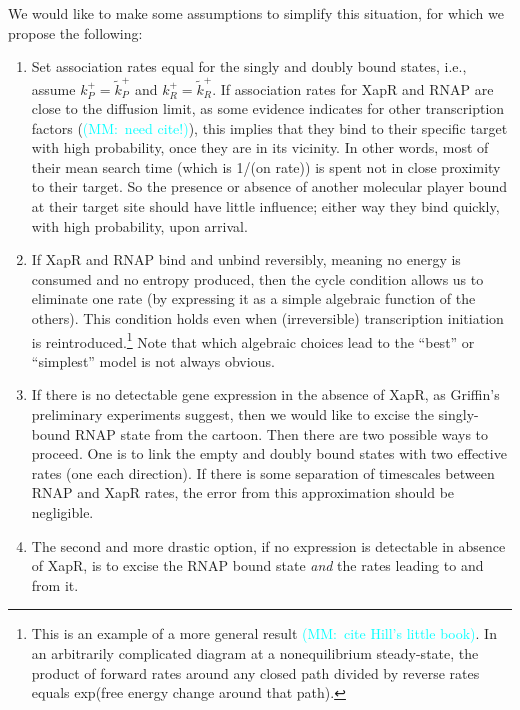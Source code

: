 \documentclass[12pt]{article}%
\newcommand{\rate}[3]{{#1}_{#2}^{#3}}
\newcommand{\mmnote}[1]{\textcolor{cyan}{(MM:~#1)}}
\begin{document}
We would like to make some assumptions to simplify this situation,
for which we propose the following:
\begin{enumerate}
    \item Set association rates equal for the singly and doubly bound states,
        i.e., assume $\rate{k}{P}{+} = \rate{\tilde{k}}{P}{+}$ and
        $\rate{k}{R}{+} = \rate{\tilde{k}}{R}{+}$.
        If association rates for XapR and RNAP are close to the diffusion limit,
        as some evidence indicates for other transcription factors (\mmnote{need cite!}),
        this implies that they bind to their specific target with high probability,
        once they are in its vicinity.
        In other words, most of their mean search time (which is 1/(on rate))
        is spent not in close proximity to their target.
        So the presence or absence of another molecular player bound at their target site should have little influence;
        either way they bind quickly, with high probability, upon arrival.
    \item If XapR and RNAP bind and unbind reversibly,
        meaning no energy is consumed and no entropy produced,
        then the cycle condition allows us to eliminate one rate
        (by expressing it as a simple algebraic function of the others).
        This condition holds even when (irreversible) transcription initiation is
        reintroduced.\footnote{This is an example of a more general result \mmnote{cite Hill's little book}.
        In an arbitrarily complicated diagram at a nonequilibrium steady-state,
        the product of forward rates around any closed path divided by reverse rates
        equals exp(free energy change around that path).}
        Note that which algebraic choices lead to the ``best'' or ``simplest'' model is not always obvious.
    \item If there is no detectable gene expression in the absence of XapR,
        as Griffin's preliminary experiments suggest,
        then we would like to excise the singly-bound RNAP state from the cartoon.
        Then there are two possible ways to proceed.
        One is to link the empty and doubly bound states with two effective rates (one each direction).
        If there is some separation of timescales between RNAP and XapR rates,
        the error from this approximation should be negligible.
        \label{item:excise_and_patch_p}
    \item The second and more drastic option, if no expression is detectable in absence of XapR,
        is to excise the RNAP bound state \textit{and} the rates leading to and from it.

\end{enumerate}
\end{document}
